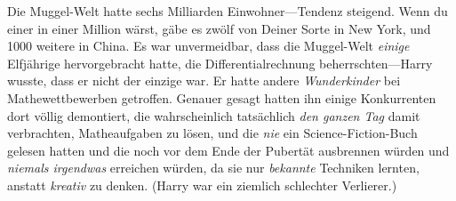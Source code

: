 Die Muggel-Welt hatte sechs Milliarden Einwohner—Tendenz steigend. Wenn du einer in einer Million wärst, gäbe es zwölf von Deiner Sorte in New York, und 1000 weitere in China. Es war unvermeidbar, dass die Muggel-Welt \emph{einige} Elfjährige hervorgebracht hatte, die Differentialrechnung beherrschten—Harry wusste, dass er nicht der einzige war. Er hatte andere \emph{Wunderkinder} bei Mathewettbewerben getroffen. Genauer gesagt hatten ihn einige Konkurrenten dort völlig demontiert, die wahrscheinlich tatsächlich \emph{den ganzen Tag} damit verbrachten, Matheaufgaben zu lösen, und die \emph{nie} ein Science-Fiction-Buch gelesen hatten und die noch vor dem Ende der Pubertät ausbrennen würden und \emph{niemals irgendwas} erreichen würden, da sie nur \emph{bekannte} Techniken lernten, anstatt \emph{kreativ} zu denken. (Harry war ein ziemlich schlechter Verlierer.)

